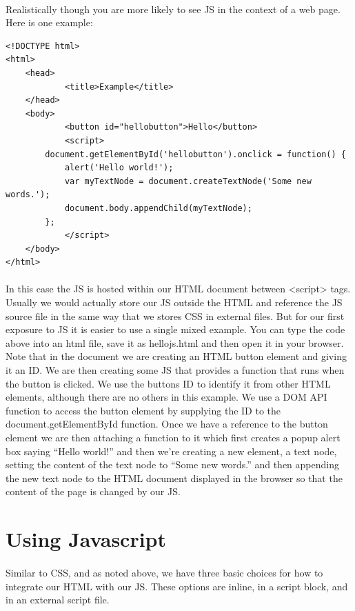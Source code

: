 \paragraph{} Realistically though you are more likely to see JS in the context of a web page. Here is one example:

\begin{lstlisting}
<!DOCTYPE html>
<html>
	<head>
    		<title>Example</title>
  	</head>
  	<body>
    		<button id="hellobutton">Hello</button>
    		<script>
        document.getElementById('hellobutton').onclick = function() {
            alert('Hello world!');     
            var myTextNode = document.createTextNode('Some new words.');
            document.body.appendChild(myTextNode);   
        };
    		</script>
  	</body>
</html>
\end{lstlisting}

\paragraph{} In this case the JS is hosted within our HTML document between <script> tags. Usually we would actually store our JS outside the HTML and reference the JS source file in the same way that we stores CSS in external files. But for our first exposure to JS it is easier to use a single mixed example. You can type the code above into an html file, save it as hellojs.html and then open it in your browser. Note that in the document we are creating an HTML button element and giving it an ID. We are then creating some JS that provides a function that runs when the button is clicked. We use the buttons ID to identify it from other HTML elements, although there are no others in this example. We use a DOM API function to access the button element by supplying the ID to the document.getElementById function. Once we have a reference to the button element we are then attaching a function to it which first creates a popup alert box saying ``Hello world!'' and then we're creating a new element, a text node, setting the content of the text node to ``Some new words.'' and then appending the new text node to the HTML document displayed in the browser so that the content of the page is changed by our JS. 


\section{Using Javascript}
\paragraph{} Similar to CSS, and as noted above, we have three basic choices for how to integrate our HTML with our JS. These options are inline, in a script block, and in an external script file.


